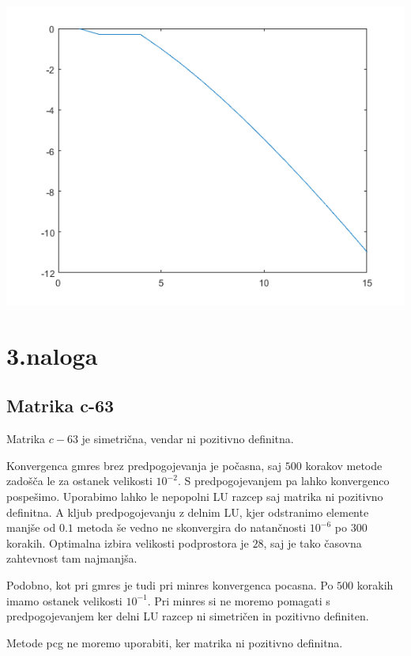 \documentclass[11pt]{article} %
\begin{document}
\begin{centering}
\includegraphics[scale=0.4]{DL4}
\end{centering}



\section{3.naloga}

\subsection{Matrika c-63}

Matrika $c-63$ je simetrična, vendar ni pozitivno definitna.

 Konvergenca gmres brez predpogojevanja je počasna, saj $500$ korakov metode zadošča le za ostanek velikosti $10^{-2}$. S predpogojevanjem pa lahko konvergenco pospešimo. Uporabimo lahko le nepopolni LU razcep saj matrika ni pozitivno definitna. A kljub predpogojevanju z delnim LU, kjer odstranimo elemente manjše od $0.1$ metoda še vedno ne skonvergira do natančnosti $10^{-6}$ po $300$ korakih. Optimalna izbira velikosti podprostora je $28$, saj je tako časovna zahtevnost tam najmanjša.

 Podobno, kot pri gmres je tudi pri minres konvergenca pocasna. Po $500$ korakih imamo ostanek velikosti $10^{-1}$. Pri minres si ne moremo pomagati s predpogojevanjem ker delni LU razcep ni  simetričen in pozitivno definiten.
 
 Metode pcg ne moremo uporabiti, ker matrika ni pozitivno definitna.
 
\end{document}
